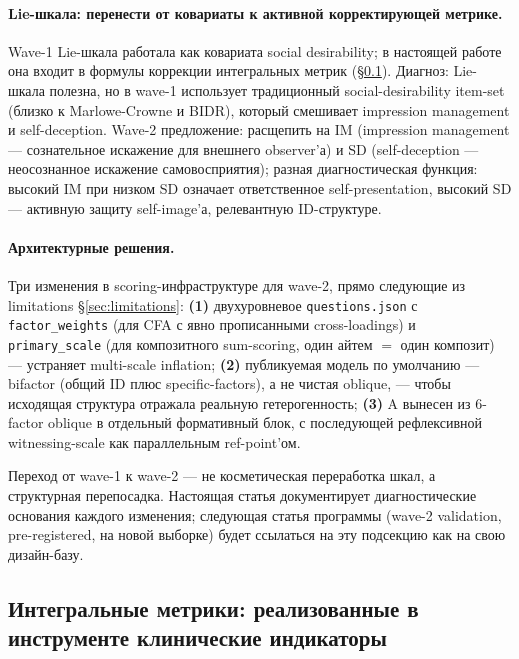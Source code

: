 \paragraph{Lie-шкала: перенести от ковариаты к активной корректирующей метрике.} Wave-1 Lie-шкала работала как ковариата social desirability; в настоящей работе она входит в формулы коррекции интегральных метрик (§\ref{subsec:integral_metrics}). Диагноз: Lie-шкала полезна, но в wave-1 использует традиционный social-desirability item-set (близко к Marlowe-Crowne и BIDR), который смешивает impression management и self-deception. Wave-2 предложение: расщепить на IM (impression management --- сознательное искажение для внешнего observer'а) и SD (self-deception --- неосознанное искажение самовосприятия); разная диагностическая функция: высокий IM при низком SD означает ответственное self-presentation, высокий SD --- активную защиту self-image'а, релевантную ID-структуре.

\paragraph{Архитектурные решения.} Три изменения в scoring-инфраструктуре для wave-2, прямо следующие из limitations \S\ref{sec:limitations}: \textbf{(1)} двухуровневое \texttt{questions.json} с \texttt{factor\_weights} (для CFA с явно прописанными cross-loadings) и \texttt{primary\_scale} (для композитного sum-scoring, один айтем $=$ один композит) --- устраняет multi-scale inflation; \textbf{(2)} публикуемая модель по умолчанию --- bifactor (общий ID плюс specific-factors), а не чистая oblique, --- чтобы исходящая структура отражала реальную гетерогенность; \textbf{(3)} A вынесен из 6-factor oblique в отдельный формативный блок, с последующей рефлексивной witnessing-scale как параллельным ref-point'ом.

Переход от wave-1 к wave-2 --- не косметическая переработка шкал, а структурная перепосадка. Настоящая статья документирует диагностические основания каждого изменения; следующая статья программы (wave-2 validation, pre-registered, на новой выборке) будет ссылаться на эту подсекцию как на свою дизайн-базу.

\subsection{Интегральные метрики: реализованные в инструменте клинические индикаторы}
\label{subsec:integral_metrics}

